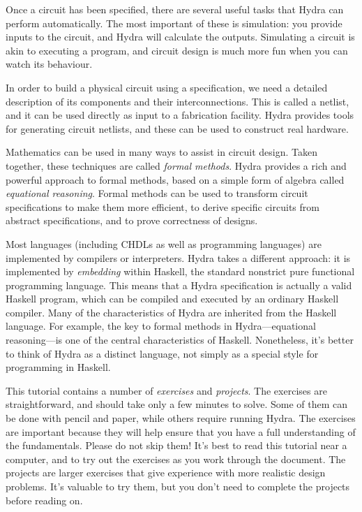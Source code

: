 \documentclass[a4paper,openany,fleqn]{book}
\begin{document}
Once a circuit has been specified, there are several useful tasks that
Hydra can perform automatically.  The most important of these is
simulation: you provide inputs to the circuit, and Hydra will
calculate the outputs.  Simulating a circuit is akin to executing a
program, and circuit design is much more fun when you can watch its
behaviour.

In order to build a physical circuit using a specification, we need a
detailed description of its components and their interconnections.
This is called a netlist, and it can be used directly as input to a
fabrication facility.  Hydra provides tools for generating circuit
netlists, and these can be used to construct real hardware.

Mathematics can be used in many ways to assist in circuit design.
Taken together, these techniques are called \emph{formal methods}.
Hydra provides a rich and powerful approach to formal methods, based
on a simple form of algebra called \emph{equational reasoning}.
Formal methods can be used to transform circuit specifications to make
them more efficient, to derive specific circuits from abstract
specifications, and to prove correctness of designs.

Most languages (including CHDLs as well as programming languages) are
implemented by compilers or interpreters.  Hydra takes a different
approach: it is implemented by \emph{embedding} within Haskell, the
standard nonstrict pure functional programming language.  This means
that a Hydra specification is actually a valid Haskell program, which
can be compiled and executed by an ordinary Haskell compiler.  Many of
the characteristics of Hydra are inherited from the Haskell language.
For example, the key to formal methods in Hydra---equational
reasoning---is one of the central characteristics of Haskell.
Nonetheless, it's better to think of Hydra as a distinct language, not
simply as a special style for programming in Haskell.

This tutorial contains a number of \emph{exercises} and
\emph{projects}.  The exercises are straightforward, and should take
only a few minutes to solve.  Some of them can be done with pencil and
paper, while others require running Hydra.  The exercises are
important because they will help ensure that you have a full
understanding of the fundamentals.  Please do not skip them!  It's
best to read this tutorial near a computer, and to try out the
exercises as you work through the document.  The projects are larger
exercises that give experience with more realistic design problems.
It's valuable to try them, but you don't need to complete the projects
before reading on.
\end{document}
